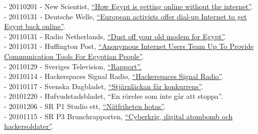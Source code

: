 \documentclass[a4paper,11pt,oneside]{article}
\begin{document}
    - 20110201 - New Scientist, \href{http://www.newscientist.com/blogs/onepercent/2011/02/egypt-remains-officially-offli.html}{``How Egypt is getting online without the internet''}. \\
    - 20110131 - Deutsche Welle, \href{http://www.dw.com/en/european-activists-offer-dial-up-internet-to-get-egypt-back-online/a-14807049}{``European activists offer dial-up Internet to get Egypt back online''}. \\
    - 20110131 - Radio Netherlands, \href{http://www.rnw.nl/english/article/dust-your-dialup-modem-contact-egypt}{``Dust off your old modem for Egypt''}. \\
    - 20110131 - Huffington Post,  \href{http://www.huffingtonpost.com/2011/01/29/anonymous-internet-egypt_n_815889.html}{``Anonymous Internet Users Team Up To Provide Communication Tools For Egyptian People''}. \\
    - 20110129 - Sveriges Television, \href{http://www.youtube.com/watch?v=HRZ0QKyiFsE&amp;feature=related}{``Rapport''.} \\
    - 20110114 - Hackerspaces Signal Radio, \href{http://signal.hackerspaces.org/archive/2011-01-13-2200-hacktivism-hour.mp3}{``Hackerspaces Signal Radio''}. \\
    - 20110117 - Svenska Dagbladet,  \href{http://www.svd.se/stjarnlackan-far-konkurrens}{``Stjärnläckan får konkurrens''}. \\
    - 20101220 - Hufvudstadsbladet, ``En rörelse som inte går att stoppa''.\\
    - 20101206 - SR P1 Studio ett, \href{http://t.sr.se/1CQkYCj}{``Nätfriheten hotas''}. \\
    - 20101115 - SR P3 Brunchrapporten, \href{http://t.sr.se/RI5PTm}{``Cyberkrig, digital atombomb och hackersoldater''}. \\
\end{document}
